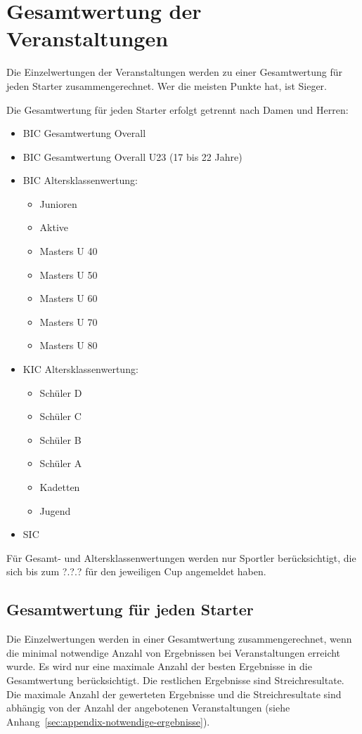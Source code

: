 \section{Gesamtwertung der Veranstaltungen}
Die Einzelwertungen der Veranstaltungen werden zu einer Gesamtwertung für jeden Starter zusammengerechnet. Wer die meisten Punkte hat, ist Sieger.

Die Gesamtwertung für jeden Starter erfolgt getrennt nach Damen und Herren:
\begin{itemize}
	\item BIC Gesamtwertung Overall
	\item BIC Gesamtwertung Overall U23 (17 bis 22 Jahre)
	\item BIC Altersklassenwertung:
	\begin{itemize}
		\item Junioren
		\item Aktive
		\item Masters U 40
		\item Masters U 50
		\item Masters U 60
		\item Masters U 70
		\item Masters U 80
	\end{itemize}
	\item KIC Altersklassenwertung:
	\begin{itemize}
		\item Schüler D
		\item Schüler C
		\item Schüler B
		\item Schüler A
		\item Kadetten
		\item Jugend
	\end{itemize}
	\item SIC
\end{itemize}

Für Gesamt- und Altersklassenwertungen werden nur Sportler berücksichtigt, die sich bis zum ?.?.? für den jeweiligen Cup angemeldet haben.

\subsection{Gesamtwertung für jeden Starter}

Die Einzelwertungen werden in einer Gesamtwertung zusammengerechnet, wenn die minimal notwendige Anzahl von Ergebnissen bei Veranstaltungen erreicht wurde. Es wird nur eine maximale Anzahl der besten Ergebnisse in die Gesamtwertung berücksichtigt. Die restlichen Ergebnisse sind Streichresultate. Die maximale Anzahl der gewerteten Ergebnisse und die Streichresultate sind abhängig von der Anzahl der angebotenen Veranstaltungen (siehe Anhang~\ref{sec:appendix-notwendige-ergebnisse}).

